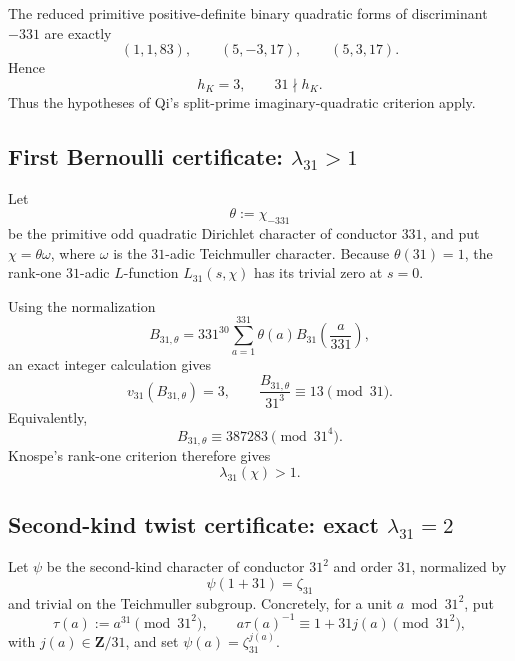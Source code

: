 \documentclass[11pt]{article}
\theoremstyle{remark}
\begin{document}
The reduced primitive positive-definite binary quadratic forms of discriminant
\(-331\) are exactly
\[
 (1,1,83),\qquad (5,-3,17),\qquad (5,3,17).
\]
Hence
\begin{equation}
 \boxed{h_K=3,\qquad 31\nmid h_K.}
 \label{eq:v063-class-number}
\end{equation}
Thus the hypotheses of Qi's split-prime imaginary-quadratic criterion apply.

\subsection{First Bernoulli certificate: \texorpdfstring{\(\lambda_{31}>1\)}{lambda31 > 1}}

Let
\[
 \theta:=\chi_{-331}
\]
be the primitive odd quadratic Dirichlet character of conductor \(331\), and
put \(\chi=\theta\omega\), where \(\omega\) is the \(31\)-adic Teichmuller
character.  Because \(\theta(31)=1\), the rank-one \(31\)-adic \(L\)-function
\(L_{31}(s,\chi)\) has its trivial zero at \(s=0\).

Using the normalization
\[
 B_{31,\theta}
 =331^{30}\sum_{a=1}^{331}
   \theta(a)B_{31}\!\left(\frac a{331}\right),
\]
an exact integer calculation gives
\begin{equation}
 \boxed{
 v_{31}(B_{31,\theta})=3,
 \qquad
 \frac{B_{31,\theta}}{31^3}\equiv13\pmod{31}.
 }
 \label{eq:v063-B31-certificate}
\end{equation}
Equivalently,
\[
 B_{31,\theta}\equiv387283\pmod{31^4}.
\]
Knospe's rank-one criterion therefore gives
\begin{equation}
 \boxed{\lambda_{31}(\chi)>1.}
 \label{eq:v063-lambda-gt1}
\end{equation}

\subsection{Second-kind twist certificate: exact \texorpdfstring{\(\lambda_{31}=2\)}{lambda31 = 2}}

Let \(\psi\) be the second-kind character of conductor \(31^2\) and order
\(31\), normalized by
\[
 \psi(1+31)=\zeta_{31}
\]
and trivial on the Teichmuller subgroup.  Concretely, for a unit
\(a\bmod31^2\), put
\[
 \tau(a):=a^{31}\pmod{31^2},
 \qquad
 a\tau(a)^{-1}\equiv1+31j(a)\pmod{31^2},
\]
with \(j(a)\in\mathbf Z/31\), and set
\(\psi(a)=\zeta_{31}^{j(a)}\).
\end{document}
